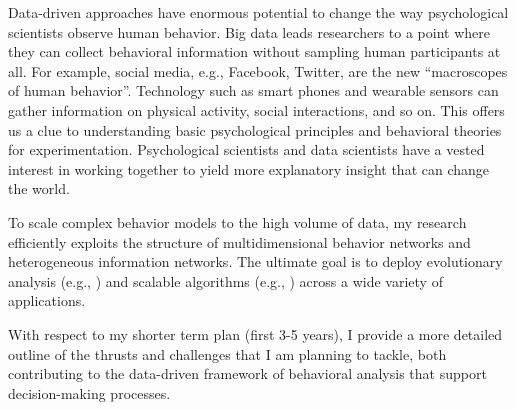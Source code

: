 \documentclass[10.5pt]{article}
\begin{document}
Data-driven approaches have enormous potential to change the way psychological scientists observe human behavior. Big data leads researchers to a point where they can collect behavioral information without sampling human participants at all. For example, social media, e.g., Facebook, Twitter, are the new ``macroscopes of human behavior''. Technology such as smart phones and wearable sensors can gather information on physical activity, social interactions, and so on. This offers us a clue to understanding basic psychological principles and behavioral theories for experimentation. Psychological scientists and data scientists have a vested interest in working together to yield more explanatory insight that can change the world.

To scale complex behavior models to the high volume of data, my research efficiently exploits the structure of multidimensional behavior networks and heterogeneous information networks. The ultimate goal is to deploy evolutionary analysis (e.g., \cite{jiang2014scalable,jiang2014fema}) and scalable algorithms (e.g., \cite{jiang2014catchsync,jiang2016catchtartan}) across a wide variety of applications.

\vskip 0.09in
\vskip 0.01in

With respect to my shorter term plan (first 3-5 years), I provide a more detailed outline of the thrusts and challenges that I am planning to tackle, both contributing to the data-driven framework of behavioral analysis that support decision-making processes.
\end{document}

